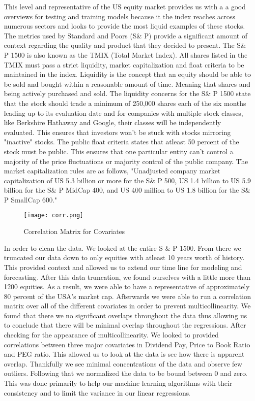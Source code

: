\documentclass[paper=letter, fontsize=11pt]{scrartcl}
\numberwithin{equation}{section}		%
\numberwithin{figure}{section}			%
\numberwithin{table}{section}				%
\begin{document}
\begin{spacing}{2}
This level and representative of the US equity market provides us with a a good overviews for testing and training models because it the index reaches across numerous sectors and looks to provide the most liquid examples of these stocks. The metrics used by Standard and Poors (S\& P) provide a significant amount of context regarding the quality and product that they decided to present. The S\& P 1500 is also known as the TMIX (Total Market Index). All shares listed in the TMIX must pass a strict liquidity, market capitalization and float criteria to be maintained in the index. Liquidity is the concept that an equity should be able to be sold and bought within a reasonable amount of time. Meaning that shares and being actively purchased and sold. The liquidity concerns for the S\& P 1500 state that the stock should trade a minimum of 250,000 shares each of the six months leading up to its evaluation date and for companies with multiple stock classes, like Berkshire Hathaway and Google, their classes will be independently evaluated. This ensures that investors won't be stuck with stocks mirroring "inactive" stocks. The public float criteria states that atleast 50 percent of the stock must be public. This ensures that one particular entity can't control a majority of the price fluctuations or majority control of the public company. The market capitalization rules are as follows, "Unadjusted company market capitalization of US 5.3 billion or more for the S\& P 500, US 1.4 billion to US 5.9 billion for the  S\& P MidCap 400, and US 400 million to US 1.8 billion for the S\& P SmallCap 600." \cite{Methodology}

\begin{figure}[Correlation]

\texttt{[image: corr.png]}
\caption{Correlation Matrix for Covariates}
\end{figure}

In order to clean the data. We looked at the entire S \& P 1500. From there we truncated our data down to only equities with atleast 10 years worth of history. This provided context and allowed us to extend our time line for modeling and forecasting. After this data truncation, we found ourselves with a little more than 1200 equities. As a result, we were able to have a representative of approximately 80 percent of the USA's market cap. Afterwards we were able to run a correlation matrix over all of the different covariates in order to prevent multicollinearity. We found that there we no significant overlaps throughout the data thus allowing us to conclude that there will be minimal overlap throughout the regressions. After checking for the appearance of multicollinearity. We looked to provided correlations between three major covariates in Dividend Pay, Price to Book Ratio and PEG ratio. This allowed us to look at the data is see how there is apparent overlap. Thankfully we see minimal concentrations of the data and observe few outliers. Following that we normalized the data to be bound between 0 and zero. This was done primarily to help our machine learning algorithms with their consistency and to limit the variance in our linear regressions. 


\end{spacing}
\end{document}
